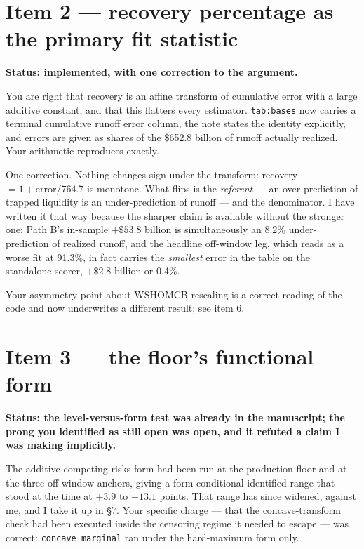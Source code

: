 \documentclass[11pt]{article}
\newcommand{\mlabel}[1]{\texttt{#1}}
\newcommand{\run}[1]{\texttt{#1}}
\begin{document}
\section{Item 2 --- recovery percentage as the primary fit statistic}

\textbf{Status: implemented, with one correction to the argument.}

You are right that recovery is an affine transform of cumulative error with a
large additive constant, and that this flatters every estimator. \mlabel{tab:bases}
now carries a terminal cumulative runoff error column, the note states the
identity explicitly, and errors are given as shares of the \$652.8 billion of
runoff actually realized. Your arithmetic reproduces exactly.

One correction. Nothing changes sign under the transform: recovery
$= 1 + \text{error}/764.7$ is monotone. What flips is the \emph{referent} --- an
over-prediction of trapped liquidity is an under-prediction of runoff --- and the
denominator. I have written it that way because the sharper claim is available
without the stronger one: Path B's in-sample $+\$53.8$ billion is simultaneously
an 8.2\% under-prediction of realized runoff, and the headline off-window leg,
which reads as a worse fit at 91.3\%, in fact carries the \emph{smallest} error in
the table on the standalone scorer, $+\$2.8$ billion or 0.4\%.

Your asymmetry point about WSHOMCB rescaling is a correct reading of the code and
now underwrites a different result; see item 6.

\section{Item 3 --- the floor's functional form}

\textbf{Status: the level-versus-form test was already in the manuscript; the
prong you identified as still open was open, and it refuted a claim I was making
implicitly.}

The additive competing-risks form had been run at the production floor and at the
three off-window anchors, giving a form-conditional identified range that stood at
the time at $+3.9$ to $+13.1$ points. That range has since widened, against me, and
I take it up in \S7. Your specific charge --- that the concave-transform check had
been executed inside the censoring regime it needed to escape --- was correct:
\run{concave\_marginal} ran under the hard-maximum form only.
\end{document}
